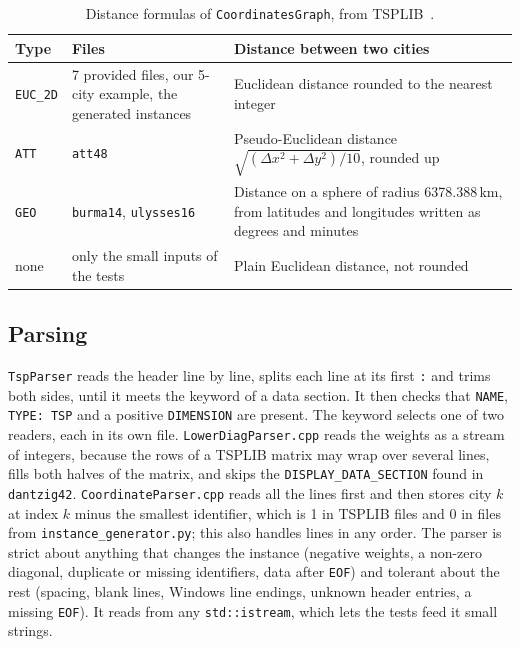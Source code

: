 \documentclass[10pt,a4paper]{article}
\begin{document}
\begin{table}[H]
\centering\footnotesize
\begin{tabularx}{\linewidth}{@{}l L{5.2cm} Y@{}}
\toprule
Type & Files & Distance between two cities \\
\midrule
\texttt{EUC\_2D} & 7 provided files, our 5-city example, the generated instances & Euclidean distance rounded to the nearest integer \\
\texttt{ATT} & \texttt{att48} & Pseudo-Euclidean distance $\sqrt{(\Delta x^2 + \Delta y^2)/10}$, rounded up \\
\texttt{GEO} & \texttt{burma14}, \texttt{ulysses16} & Distance on a sphere of radius 6378.388\,km, from latitudes and longitudes written as degrees and minutes \\
none & only the small inputs of the tests & Plain Euclidean distance, not rounded \\
\bottomrule
\end{tabularx}
\caption{Distance formulas of \texttt{CoordinatesGraph}, from TSPLIB~\cite{tsplib}.}
\label{tab-distances}
\end{table}

\subsection{Parsing}\label{sec-parsing}

\texttt{TspParser} reads the header line by line, splits each line at its first \texttt{:} and trims both sides, until it meets the keyword of a data section. It then checks that \texttt{NAME}, \texttt{TYPE: TSP} and a positive \texttt{DIMENSION} are present. The keyword selects one of two readers, each in its own file. \texttt{LowerDiagParser.cpp} reads the weights as a stream of integers, because the rows of a TSPLIB matrix may wrap over several lines, fills both halves of the matrix, and skips the \texttt{DISPLAY\_DATA\_SECTION} found in \texttt{dantzig42}. \texttt{CoordinateParser.cpp} reads all the lines first and then stores city $k$ at index $k$ minus the smallest identifier, which is 1 in TSPLIB files and 0 in files from \texttt{instance\_generator.py}; this also handles lines in any order. The parser is strict about anything that changes the instance (negative weights, a non-zero diagonal, duplicate or missing identifiers, data after \texttt{EOF}) and tolerant about the rest (spacing, blank lines, Windows line endings, unknown header entries, a missing \texttt{EOF}). It reads from any \texttt{std::istream}, which lets the tests feed it small strings.
\end{document}
